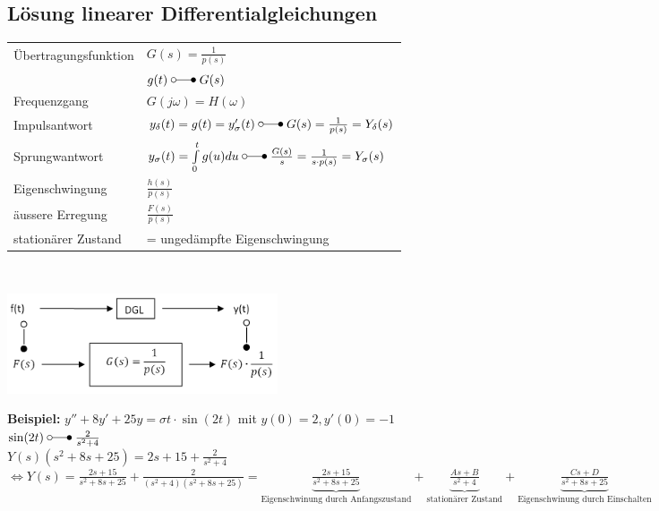 	\subsection{Lösung linearer Differentialgleichungen }
		\begin{minipage}{11.5cm}
			\renewcommand{\arraystretch}{2}
			\begin{tabular}{| l | l |}
				\hline
					Übertragungsfunktion & $G(s) = \frac{1}{p(s)}$\\
					& $g(t) \; \laplace \; G(s)$ \\
				\hline
					Frequenzgang & $G(j\omega) = H(\omega)$ \\
				\hline
					Impulsantwort & $y_{\delta}(t) = g(t) = y_{\sigma}'(t) \; \laplace \; G(s) = \frac{1}{p(s)}=Y_{\delta}(s)$\\
				\hline
					Sprungwantwort & $y_{\sigma}(t)=\int\limits_0^t g(u) du \; \laplace \; \frac{G(s)}{s} = \frac{1}{s \cdot p(s)} = Y_{\sigma}(s)$\\
				\hline
					Eigenschwingung & $\frac{h(s)}{p(s)}$ \\
				\hline
					äussere Erregung & $\frac{F(s)}{p(s)}$ \\
				\hline
					stationärer Zustand & = ungedämpfte Eigenschwingung\\
				\hline
			\end{tabular}
			\renewcommand{\arraystretch}{\arraystretchOriginal}\\
		\end{minipage}
		\begin{minipage}{8cm}
					\includegraphics[width=8cm]{./bilder/diffgleichungen2.png} \\
		\end{minipage}
		
		
		\begin{minipage}[l]{16cm}
				\textbf{Beispiel:} $y'' + 8y' + 25y = \sigma{t} \cdot \sin(2t)$ mit $y(0) = 2, y'(0) = -1$\\
				
				$\sin(2t) \; \laplace \; \frac{2}{s^2+4}$ \\ $Y(s)(s^2+8s+25) = 2s+15+\frac{2}{s^2+4}$
				$\Leftrightarrow Y(s) = \frac{2s+15}{s^2+8s+25}+\frac{2}{(s^2+4)(s^2+8s+25)}=
				\underbrace{\frac{2s+15}{s^2+8s+25}}_\text{Eigenschwinung durch Anfangszustand} +
				\underbrace{\frac{As + B}{s^2+4}}_\text{stationärer Zustand} +
				\underbrace{\frac{Cs + D}{s^2+8s+25}}_\text{Eigenschwinung durch Einschalten}$
		\end{minipage}
